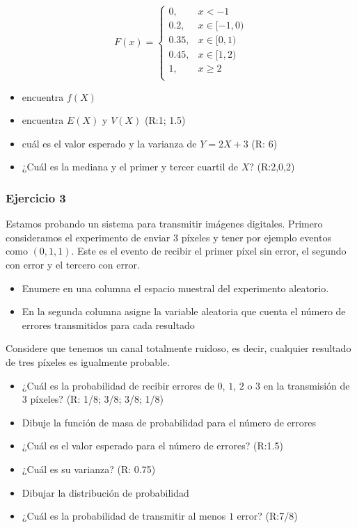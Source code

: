 \documentclass[
]{book}
\providecommand{\tightlist}{%
  \setlength{\itemsep}{0pt}\setlength{\parskip}{0pt}}
\begin{document}
\[
    F(x)=
\begin{cases}
0, & x < -1 \\
0.2,& x \in [-1,0)\\
0.35,& x \in [0,1)\\
0.45,& x \in [1,2)\\
1,& x \geq 2\\
\end{cases}
\]

\begin{itemize}
\tightlist
\item
  encuentra \(f(X)\)
\item
  encuentra \(E(X)\) y \(V(X)\) (R:1; 1.5)
\item
  cuál es el valor esperado y la varianza de \(Y=2X+3\) (R: 6)
\item
  ¿Cuál es la mediana y el primer y tercer cuartil de \(X\)? (R:2,0,2)
\end{itemize}

\hypertarget{ejercicio-3-1}{%
\subsubsection{Ejercicio 3}\label{ejercicio-3-1}}

Estamos probando un sistema para transmitir imágenes digitales. Primero consideramos el experimento de enviar \(3\) píxeles y tener por ejemplo eventos como \((0,1,1)\). Este es el evento de recibir el primer píxel sin error, el segundo con error y el tercero con error.

\begin{itemize}
\item
  Enumere en una columna el espacio muestral del experimento aleatorio.
\item
  En la segunda columna asigne la variable aleatoria que cuenta el número de errores transmitidos para cada resultado
\end{itemize}

Considere que tenemos un canal totalmente ruidoso, es decir, cualquier resultado de tres píxeles es igualmente probable.

\begin{itemize}
\item
  ¿Cuál es la probabilidad de recibir errores de \(0\), \(1\), \(2\) o \(3\) en la transmisión de \(3\) píxeles? (R: 1/8; 3/8; 3/8; 1/8)
\item
  Dibuje la función de masa de probabilidad para el número de errores
\item
  ¿Cuál es el valor esperado para el número de errores? (R:1.5)
\item
  ¿Cuál es su varianza? (R: 0.75)
\item
  Dibujar la distribución de probabilidad
\item
  ¿Cuál es la probabilidad de transmitir al menos \(1\) error?
  (R:7/8)
\end{itemize}
\end{document}
